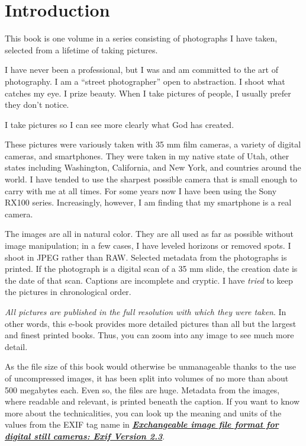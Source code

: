 \chapter{Introduction}

This book is one volume in a series consisting of photographs I have taken, selected from a lifetime of taking pictures. 

I have never been a professional, but I was and am committed to the art of photography. I am a ``street photographer'' open to abstraction. I shoot what catches my eye. I prize beauty. When I take pictures of people, I usually prefer they don't notice. 

I take pictures so I can see more clearly what God has created.

These pictures were variously taken with 35 mm film cameras, a variety of digital cameras, and smartphones. They were taken in my native state of Utah, other states including Washington, California, and New York, and countries around the world. I have tended to use the sharpest possible camera that is small enough to carry with me at all times. For some years now I have been using the Sony RX100 series. Increasingly, however, I am finding that my smartphone is a real camera.

The images are all in natural color. They are all used as far as possible without image manipulation; in a few cases, I have leveled horizons or removed spots. I shoot in JPEG rather than RAW. Selected metadata from the photographs is printed. If the photograph is a digital scan of a 35 mm slide, the creation date is the date of that scan. Captions are incomplete and cryptic. I have \emph{tried} to keep the pictures in chronological order.

\emph{All pictures are published in the full resolution with which they were taken}. In other words, this e-book provides more detailed pictures than all but the  largest and finest printed books. Thus, you can zoom into any image to see much more detail.

 As the file size of this book would otherwise be unmanageable thanks to the use of uncompressed images, it has been split into volumes of no more than about 500 megabytes each. Even so, the files are huge. Metadata from the images, where readable and relevant, is printed beneath the caption. If you want to know more about the technicalities, you can look up the meaning and units of the values from the EXIF tag name in \href{https://www.cipa.jp/std/documents/e/DC-008-2012_E.pdf}{\emph{\textbf{Exchangeable image file format for digital still cameras: Exif Version 2.3}}}.

